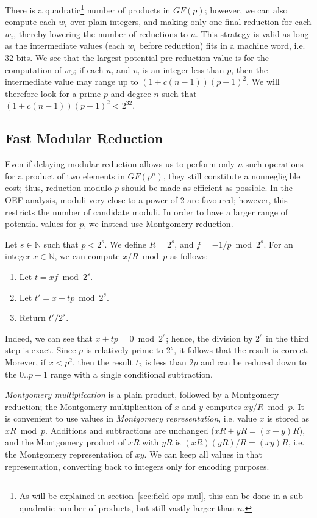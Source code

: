 \documentclass{llncs}
\newcommand{\GF}{GF}
\newcommand{\bN}{\mathbb{N}}
\begin{document}
There is a quadratic\footnote{As will be explained in
section~\ref{sec:field-ops-mul}, this can be done in a sub-quadratic
number of products, but still vastly larger than $n$.} number of
products in $\GF(p)$; however, we can also compute each $w_i$ over plain
integers, and making only one final reduction for each $w_i$, thereby
lowering the number of reductions to $n$. This strategy is valid as long
as the intermediate values (each $w_i$ before reduction) fits in a
machine word, i.e. 32 bits. We see that the largest potential
pre-reduction value is for the computation of $w_0$; if each $u_i$ and
$v_i$ is an integer less than $p$, then the intermediate value may range
up to $(1+c(n-1))(p-1)^2$. We will therefore look for a prime $p$ and
degree $n$ such that $(1+c(n-1))(p-1)^2 < 2^{32}$.

\subsection{Fast Modular Reduction}\label{sec:field-fast-reduction}

Even if delaying modular reduction allows us to perform only $n$ such
operations for a product of two elements in $\GF(p^n)$, they still
constitute a nonnegligible cost; thus, reduction modulo $p$ should be
made as efficient as possible. In the OEF analysis\cite{BaiPaa1998},
moduli very close to a power of 2 are favoured; however, this restricts
the number of candidate moduli. In order to have a larger range of
potential values for $p$, we instead use Montgomery
reduction\cite{Mon1985}.

Let $s \in \bN$ such that $p < 2^s$. We define $R = 2^s$, and $f = -1/p
\bmod 2^s$. For an integer $x \in \bN$, we can compute $x/R \bmod p$ as
follows:
\begin{enumerate}
    \item Let $t = xf \bmod 2^s$.
    \item Let $t' = x + tp \bmod 2^s$.
    \item Return $t' / 2^s$.
\end{enumerate}
Indeed, we can see that $x + tp = 0 \bmod 2^s$; hence, the division by
$2^s$ in the third step is exact. Since $p$ is relatively prime to $2^s$,
it follows that the result is correct. Morever, if $x < p^2$, then the
result $t_2$ is less than $2p$ and can be reduced down to the $0$..$p-1$
range with a single conditional subtraction.

\emph{Montgomery multiplication} is a plain product, followed by a
Montgomery reduction; the Montgomery multiplication of $x$ and $y$
computes $xy/R \bmod p$. It is convenient to use values in
\emph{Montgomery representation}, i.e. value $x$ is stored as $xR \bmod
p$. Additions and subtractions are unchanged ($xR+yR = (x+y)R$), and the
Montgomery product of $xR$ with $yR$ is $(xR)(yR)/R = (xy)R$, i.e. the
Montgomery representation of $xy$. We can keep all values in that
representation, converting back to integers only for encoding purposes.
\end{document}

